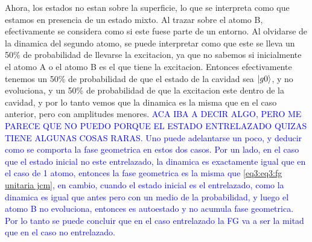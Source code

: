 Ahora, los estados no estan sobre la superficie, lo que se interpreta como que estamos en presencia de un estado mixto. Al trazar sobre el atomo B, efectivamente se considera como si este fuese parte de un entorno. Al olvidarse de la dinamica del segundo atomo, se puede interpretar como que este se lleva un 50\% de probabilidad de llevarse la excitacion, ya que no sabemos si inicialmente el atomo A o el atomo B es el que tiene la excitacion. Entonces efectivamente tenemos un 50\% de probabilidad de que el estado de la cavidad sea $\ket{g0}$, y no evoluciona, y un 50\% de probabilidad de que la excitacion este dentro de la cavidad, y por lo tanto vemos que la dinamica es la misma que en el caso anterior, pero con amplitudes menores. \textcolor{blue}{ACA IBA A DECIR ALGO, PERO ME PARECE QUE NO PUEDO PORQUE EL ESTADO ENTRELAZADO QUIZAS TIENE ALGUNAS COSAS RARAS. Uno puede adelantarse un poco, y deducir como se comporta la fase geometrica en estos dos casos. Por un lado, en el caso que el estado inicial no este entrelazado, la dinamica es exactamente igual que en el caso de 1 atomo, entonces la fase geometrica es la misma que \ref{eq3:eq3:fg unitaria jcm}, en cambio, cuando el estado inicial es el entrelazado, como la dinamica es igual que antes pero con un medio de la probabilidad, y luego el atomo B no evoluciona, entonces es autoestado y no acumula fase geometrica. Por lo tanto se puede concluir que en el caso entrelazado la FG va a ser la mitad que en el caso no entrelazado.}



